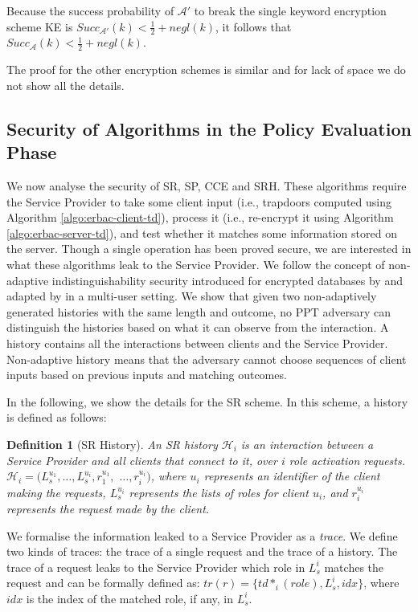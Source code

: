 \documentclass[epsfig,a4paper,11pt,titlepage]{book}
\newtheorem{definition}{Definition}
\numberwithin{algorithm}{chapter}
\begin{document}
Because the success probability of $\mathcal{A}'$ to break the single keyword encryption scheme \gls{KE} is $Succ_{\mathcal{A}'}(k) < \frac{1}{2} + negl(k)$, it follows that $Succ_{\mathcal{A}}(k) < \frac{1}{2} + negl(k)$.

The proof for the other encryption schemes is similar and for lack of space we do not show all the details.

\subsection{Security of Algorithms in the Policy Evaluation Phase}
We now analyse the security of \gls{SR}, \gls{SP}, \gls{CCE} and \gls{SRH}. These algorithms require the Service Provider to take some client input (i.e., trapdoors computed using Algorithm \ref{algo:erbac-client-td}), process it (i.e., re-encrypt it using Algorithm \ref{algo:erbac-server-td}), and test whether it matches some information stored on the server. Though a single operation has been proved secure, we are interested in what these algorithms leak to the Service Provider. We follow the concept of non-adaptive indistinguishability security introduced for encrypted databases by \cite{Curtmola:2006} and adapted by \cite{Dong:2011} in a multi-user setting. We show that given two non-adaptively generated histories with the same length and outcome, no \gls{PPT} adversary can distinguish the histories based on what it can observe from the interaction. A history contains all the interactions between clients and the Service Provider. Non-adaptive history means that the adversary cannot choose sequences of client inputs based on previous inputs and matching outcomes.

In the following, we show the details for the \gls{SR} scheme. In this scheme, a history is defined as follows:

\begin{definition}[\gls{SR} History]
An \gls{SR} history $\mathcal{H}_i$ is an interaction between a Service Provider and all clients that connect to it, over $i$ role activation requests. $\mathcal{H}_i=(L_s^{u_1}, \ldots, L_s^{u_i}, r_{1}^{u_1},$ $\ldots, r_{i}^{u_i})$, where $u_i$ represents an identifier of the client making the requests, $L_s^{u_i}$ represents the lists of roles for client $u_i$, and $r_{i}^{u_i}$ represents the request made by the client.
\end{definition}

We formalise the information leaked to a Service Provider as a \textit{trace}. We define two kinds of traces: the trace of a single request and the trace of a history. The trace of a request leaks to the Service Provider which role in $L_s^{i}$ matches the request and can be formally defined as: $tr(r)=\{td*_i(role), L_s^{i}, idx\}$, where $idx$ is the index of the matched role, if any, in $L_s^{i}$.
\end{document}
